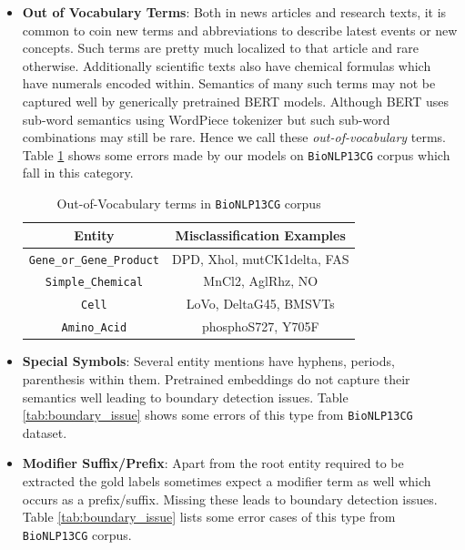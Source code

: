 \begin{itemize}
    \item \textbf{Out of Vocabulary Terms}: Both in news articles and research texts, it is common to coin new terms and abbreviations to describe latest events or new concepts. Such terms are pretty much localized to that article and rare otherwise. Additionally scientific texts also have chemical formulas which have numerals encoded within. Semantics of many such terms may not be captured well by generically pretrained BERT models. Although BERT uses sub-word semantics using WordPiece tokenizer but such sub-word combinations may still be rare. Hence we call these \textit{out-of-vocabulary} terms. Table \ref{tab:oov_issue} shows some errors made by our models on \texttt{BioNLP13CG} corpus which fall in this category.
    
    \begin{table}[h!]
    \centering
    \begin{tabular}{|c|c|}\hline
    	\textbf{Entity} & \textbf{Misclassification Examples}\\\hline
    	\texttt{Gene\_or\_Gene\_Product} & DPD, Xhol, mutCK1delta, FAS\\\hline
    	\texttt{Simple\_Chemical} & MnCl2, AglRhz, NO\\\hline
    	\texttt{Cell} & LoVo, DeltaG45, BMSVTs\\\hline
    	\texttt{Amino\_Acid} & phosphoS727, Y705F\\\hline
    	\end{tabular}
        \caption{Out-of-Vocabulary terms in \texttt{BioNLP13CG} corpus}
        \label{tab:oov_issue}
    \end{table}
    
    \item \textbf{Special Symbols}: Several entity mentions have hyphens, periods, parenthesis within them. Pretrained embeddings do not capture their semantics well leading to boundary detection issues. Table \ref{tab:boundary_issue} shows some errors of this type from \texttt{BioNLP13CG} dataset.
    
    \item \textbf{Modifier Suffix/Prefix}: Apart from the root entity required to be extracted the gold labels sometimes expect a modifier term as well which occurs as a prefix/suffix. Missing these leads to boundary detection issues. Table \ref{tab:boundary_issue} lists some error cases of this type from \texttt{BioNLP13CG} corpus.
    

\end{itemize}
